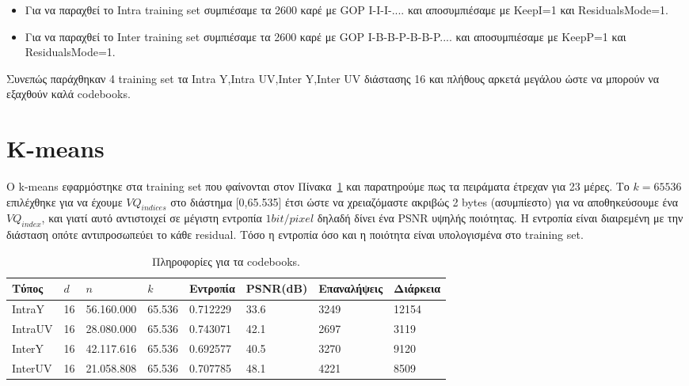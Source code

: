 \begin{itemize}
    \item Για να παραχθεί το Intra training set συμπιέσαμε τα 2600 καρέ με GOP I-I-I-.... και αποσυμπιέσαμε με KeepI=1 και ResidualsMode=1.
    \item Για να παραχθεί το Inter training set συμπιέσαμε τα 2600 καρέ με GOP I-Β-Β-P-B-B-P.... και αποσυμπιέσαμε με KeepP=1 και ResidualsMode=1.
\end{itemize}

\indent Συνεπώς παράχθηκαν 4 training set τα Intra Y,Intra UV,Inter Y,Inter UV διάστασης 16 και πλήθους αρκετά μεγάλου ώστε να μπορούν να εξαχθούν καλά codebooks.

\section{K-means}
\label{section:sect44}

\indent Ο k-means εφαρμόστηκε στα training set που φαίνονται στον Πίνακα~\ref{table:trainingset} και παρατηρούμε πως τα πειράματα έτρεχαν για 23 μέρες. Το $k=65536$ επιλέχθηκε για να έχουμε $VQ_{indices}$ στο διάστημα [0,65.535] έτσι ώστε να χρειαζόμαστε ακριβώς 2 bytes (ασυμπίεστο) για να αποθηκεύσουμε ένα $VQ_{index}$, και γιατί αυτό αντιστοιχεί σε μέγιστη εντροπία $1 bit/pixel$ δηλαδή δίνει ένα PSNR υψηλής ποιότητας. Η εντροπία είναι διαιρεμένη με την διάσταση οπότε αντιπροσωπεύει το κάθε residual. Τόσο η εντροπία όσο και η ποιότητα είναι υπολογισμένα στο training set.

\begin{table}[h!]
    \begin{center}
        \begin{tabular}{|| l || l || l || l || l | l | l | l |}
        \hline
        Τύπος    & $d$  & $n$      & $k$   & Εντροπία   & PSNR(dB) & Επαναλήψεις   & Διάρκεια       \\ \hline
        IntraY   & 16   & 56.160.000 & 65.536 & 0.712229   & 33.6     &  3249         & 12154          \\ \hline
        IntraUV  & 16   & 28.080.000 & 65.536 & 0.743071   & 42.1     &  2697         & 3119           \\ \hline
        InterY   & 16   & 42.117.616 & 65.536 & 0.692577   & 40.5     &  3270         & 9120           \\ \hline
        InterUV  & 16   & 21.058.808 & 65.536 & 0.707785   & 48.1     &  4221         & 8509           \\ \hline
        \hline
        \end{tabular}
    \end{center}

    \caption{Πληροφορίες για τα codebooks.}
    \label{table:trainingset}
\end{table}

